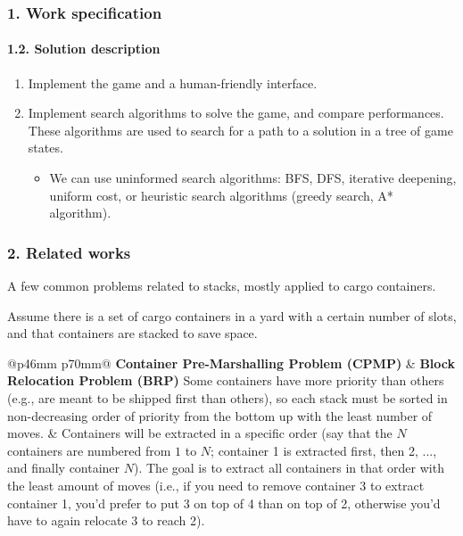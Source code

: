 \documentclass{beamer}
\def\\{}
\begin{document}
\begin{frame}
\frametitle{1. Work specification}
\framesubtitle{1.2. Solution description}

\begin{enumerate}
  \itemsep0em
  \item Implement the game and a human-friendly interface.
  \item Implement search algorithms to solve the game, and compare performances. These algorithms are used to search for a path to a solution in a tree of game states.

  \begin{itemize}
    \itemsep0em
    \item We can use uninformed search algorithms: BFS, DFS, iterative deepening, uniform cost, or heuristic search algorithms (greedy search, A* algorithm).
  \end{itemize}
\end{enumerate}

\end{frame}

\begin{frame}
\frametitle{2. Related works}

A few common problems related to stacks, mostly applied to cargo containers.

Assume there is a set of cargo containers in a yard with a certain number of slots, and that containers are stacked to save space.

\vspace{0.5em}

\begin{tabular}{@{}p{46mm} p{70mm}@{}}
  \textbf{Container Pre-Marshalling Problem (CPMP)} & \textbf{Block Relocation Problem (BRP)} \\
  Some containers have more priority than others (e.g., are meant to be shipped first than others), so each stack must be sorted in non-decreasing order of priority from the bottom up with the least number of moves. &
  Containers will be extracted in a specific order (say that the $N$ containers are numbered from $1$ to $N$; container 1 is extracted first, then 2, ..., and finally container $N$). The goal is to extract all containers in that order with the least amount of moves (i.e., if you need to remove container 3 to extract container 1, you'd prefer to put 3 on top of 4 than on top of 2, otherwise you'd have to again relocate 3 to reach 2).
\end{tabular}

\end{frame}
\end{document}
